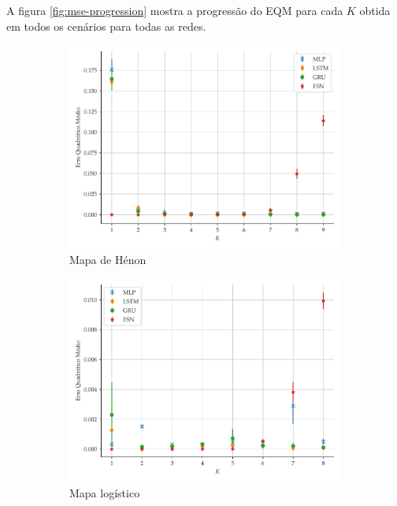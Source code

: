 \documentclass{article}
\begin{document}
A figura \ref{fig:mse-progression} mostra a progressão do EQM para cada $K$ obtida em todos os cenários para todas as redes. 
\begin{figure}[H]
     \begin{subfigure}[t]{0.2\textwidth} 
         \includegraphics[scale=0.2]{progressao-k-henon.pdf}
         \caption{Mapa de Hénon}
     \end{subfigure}
     \centering
     \begin{subfigure}[t]{0.2\textwidth} 
         \includegraphics[scale=0.2]{progressao-k-logistic.pdf}
         \caption{Mapa logístico}
     \end{subfigure}
     \centering
     \begin{subfigure}[t]{0.2\textwidth}

\end{subfigure}
\end{figure}
\end{document}
